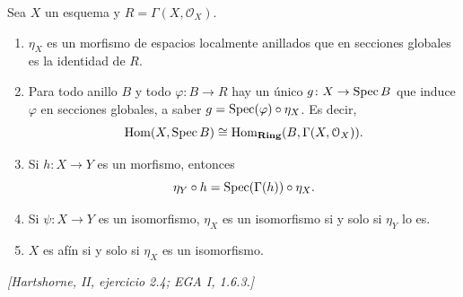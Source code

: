 \begin{prop}
\label{prop:s08-propiedades-morfismo-canonico}
Sea $X$ un esquema y $R=\Gamma(X,\mathcal O_X)$.
\begin{enumerate}[label=(\alph*)]
\item $\eta_X$ es un morfismo de espacios localmente anillados que en secciones globales es la identidad de $R$.
\item Para todo anillo $B$ y todo $\varphi\colon B\to R$ hay un único $g\colon X\to\operatorname{Spec} B$ que induce $\varphi$ en secciones globales, a saber $g=\operatorname{Spec}(\varphi)\circ\eta_X$. Es decir,
\[
\operatorname{Hom}(X,\operatorname{Spec} B)\cong\operatorname{Hom}_{\mathbf{Ring}}(B,\Gamma(X,\mathcal O_X)).
\]
\item Si $h\colon X\to Y$ es un morfismo, entonces
\[
\eta_Y\circ h=\operatorname{Spec}(\Gamma(h))\circ\eta_X.
\]
\item Si $\psi\colon X\to Y$ es un isomorfismo, $\eta_X$ es un isomorfismo si y solo si $\eta_Y$ lo es.
\item $X$ es afín si y solo si $\eta_X$ es un isomorfismo.
\end{enumerate}
\emph{[Hartshorne, II, ejercicio 2.4; EGA I, 1.6.3.]}
\end{prop}
